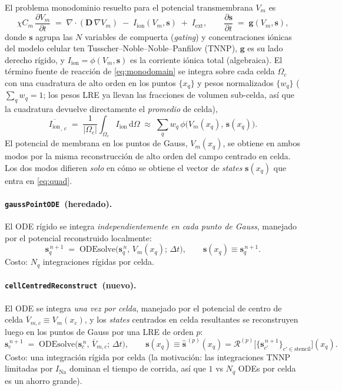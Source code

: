 \documentclass[11pt,a4paper]{article}
\newcommand{\Vm}{V_{m}}
\newcommand{\Iion}{I_{\text{ion}}}
\newcommand{\Iext}{I_{\text{ext}}}
\newcommand{\Dten}{\mathbf{D}}
\newcommand{\grad}{\nabla}
\newcommand{\divg}{\nabla\!\cdot}
\newcommand{\code}[1]{\texttt{\small #1}}
\newcommand{\gpode}{\code{gaussPointODE}}
\newcommand{\ccrec}{\code{cellCentredReconstruct}}
\newcommand{\states}{\mathbf{s}}
\newcommand{\Vbarc}{\overline{V}_{m,c}}
\newcommand{\Omegac}{\Omega_{c}}
\begin{document}
El problema monodominio resuelto para el potencial transmembrana $\Vm$ es
\begin{equation}
  \chi C_m \,\frac{\partial \Vm}{\partial t}
  \;=\; \divg\!\left(\Dten\,\grad \Vm\right)
        \;-\; \Iion(\Vm,\states) \;+\; \Iext ,
  \qquad
  \frac{\partial \states}{\partial t} \;=\; \mathbf{g}(\Vm,\states),
  \label{eq:monodomain}
\end{equation}
donde $\states$ agrupa las $N$ variables de compuerta (\emph{gating}) y
concentraciones iónicas del modelo celular ten Tusscher--Noble--Noble--Panfilov
(TNNP), $\mathbf{g}$ es su lado derecho rígido, y $\Iion=\phi(\Vm,\states)$ es la
corriente iónica total (algebraica). El término fuente de reacción de
\eqref{eq:monodomain} se integra sobre cada celda $\Omegac$ con una cuadratura de
alto orden en los puntos $\{x_q\}$ y pesos normalizados $\{w_q\}$
($\sum_q w_q=1$; los pesos LRE ya llevan las fracciones de volumen sub-celda, así
que la cuadratura devuelve directamente el \emph{promedio} de celda),
\begin{equation}
  \overline{\Iion}_{,\,c}
  \;=\; \frac{1}{|\Omegac|}\int_{\Omegac} \Iion \,\mathrm{d}\Omega
  \;\approx\; \sum_{q} w_q\,\phi\!\big(\Vm(x_q),\,\states(x_q)\big).
  \label{eq:quad}
\end{equation}
El potencial de membrana en los puntos de Gauss, $\Vm(x_q)$, se obtiene en ambos
modos por la misma reconstrucción de alto orden del campo centrado en celda. Los
dos modos difieren \emph{solo} en cómo se obtiene el vector de \emph{states}
$\states(x_q)$ que entra en \eqref{eq:quad}.

\paragraph{\gpode\ (heredado).}
El ODE rígido se integra \emph{independientemente en cada punto de Gauss},
manejado por el potencial reconstruido localmente:
\begin{equation}
  \states_q^{\,n+1}
  \;=\; \mathrm{ODEsolve}\!\big(\states_q^{\,n},\,\Vm(x_q);\,\Delta t\big),
  \qquad
  \states(x_q) \equiv \states_q^{\,n+1}.
  \label{eq:gp}
\end{equation}
Costo: $N_q$ integraciones rígidas por celda.

\paragraph{\ccrec\ (nuevo).}
El ODE se integra \emph{una vez por celda}, manejado por el potencial de centro de
celda $\Vbarc \equiv \Vm(x_c)$, y los \emph{states} centrados en celda resultantes
se reconstruyen luego en los puntos de Gauss por una LRE de orden $p$:
\begin{equation}
  \states_c^{\,n+1}
  \;=\; \mathrm{ODEsolve}\!\big(\states_c^{\,n},\,\Vbarc;\,\Delta t\big),
  \qquad
  \states(x_q) \equiv \widehat{\states}^{\,(p)}(x_q)
        = \mathcal{R}^{(p)}\!\big[\{\states_{c'}^{\,n+1}\}_{c'\in\text{stencil}}\big](x_q).
  \label{eq:cc}
\end{equation}
Costo: una integración rígida por celda (la motivación: las integraciones TNNP
limitadas por $I_{\mathrm{Na}}$ dominan el tiempo de corrida, así que $1$ vs $N_q$
ODEs por celda es un ahorro grande).
\end{document}
